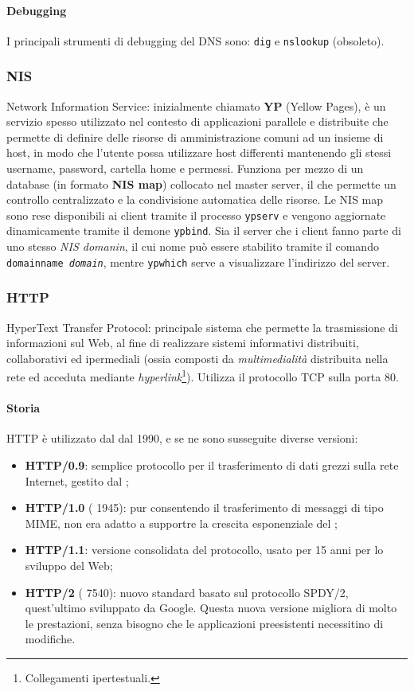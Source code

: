 \documentclass[a4paper,11pt]{article}
\def\code#1{\texttt{#1}}
\def\subsub#1{\subsubsection{#1}\label{#1}}
\def\vedi#1{\nameref{#1}}
\begin{document}
\paragraph{Debugging} I principali strumenti di debugging del DNS sono: \code{dig} e \code{nslookup} (obsoleto).
\newpage
\subsub{NIS}
Network Information Service: inizialmente chiamato \textbf{YP} (Yellow Pages), è un servizio spesso utilizzato nel contesto di applicazioni parallele e distribuite che permette di definire delle risorse di amministrazione comuni ad un insieme di host, in modo che l'utente possa utilizzare host differenti mantenendo gli stessi username, password, cartella home e permessi. Funziona per mezzo di un database (in formato \textbf{NIS map}) collocato nel master server, il che permette un controllo centralizzato e la condivisione automatica delle risorse. Le NIS map sono rese disponibili ai client tramite il processo \code{ypserv} e vengono aggiornate dinamicamente tramite il demone \code{ypbind}. Sia il server che i client fanno parte di uno stesso \textit{NIS domanin}, il cui nome può essere stabilito tramite il comando \code{domainname \textit{domain}}, mentre \code{ypwhich} serve a visualizzare l'indirizzo del server. 
\subsub{HTTP} 
HyperText Transfer Protocol: principale sistema che permette la trasmissione di informazioni sul Web, al fine di realizzare sistemi informativi distribuiti, collaborativi ed ipermediali (ossia composti da \textit{multimedialità} distribuita nella rete ed acceduta mediante \textit{hyperlink}\footnote{Collegamenti ipertestuali.}). Utilizza il protocollo TCP sulla porta 80.
\paragraph{Storia} HTTP è utilizzato dal \vedi{WWW} dal 1990, e se ne sono susseguite diverse versioni:
\begin{itemize}
\item \textbf{HTTP/0.9}: semplice protocollo per il trasferimento di dati grezzi sulla rete Internet, gestito dal \vedi{W3C};
\item \textbf{HTTP/1.0} (\vedi{RFC} 1945): pur consentendo il trasferimento di messaggi di tipo MIME, %
non era adatto a supportre la crescita esponenziale del \vedi{WWW};
\item \textbf{HTTP/1.1}: versione consolidata del protocollo, usato per 15 anni per lo sviluppo del Web;
\item \textbf{HTTP/2} (\vedi{RFC} 7540): nuovo standard basato sul protocollo SPDY/2, quest'ultimo sviluppato da Google. Questa nuova versione migliora di molto le prestazioni, senza bisogno che le applicazioni preesistenti necessitino di modifiche. 
\end{itemize}
\end{document}
